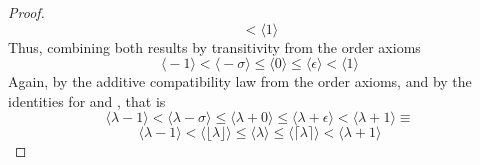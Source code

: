 \documentclass[preview]{standalone}
\begin{document}
\begin{proof}
\begin{equation*}
            <
        \Big \langle 1 \Big \rangle
    \end{equation*}
    Thus, combining both results by transitivity from the order axioms
    \begin{equation*}
        \Big \langle -1 \Big \rangle
            <
        \Big \langle - \sigma \Big \rangle
            \leq
        \Big \langle 0 \Big \rangle
            \leq
        \Big \langle \epsilon \Big \rangle
            <
        \Big \langle 1 \Big \rangle
    \end{equation*}
    Again, by the additive compatibility law from the order axioms, 
    and by the identities for 
    \bm{$\lfloor \lambda \rfloor$} and \bm{$\lceil \lambda \rceil$},
    that is
    \begin{equation*}
        \Big \langle \lambda - 1 \Big \rangle
            <
        \Big \langle \lambda - \sigma \Big \rangle
            \leq
        \Big \langle \lambda + 0 \Big \rangle
            \leq
        \Big \langle \lambda + \epsilon \Big \rangle
            <
        \Big \langle \lambda + 1 \Big \rangle
            \equiv
    \end{equation*}
    \begin{equation*}
        \Big \langle \lambda - 1 \Big \rangle
            <
        \Big \langle \lfloor \lambda \rfloor \Big \rangle
            \leq
        \Big \langle \lambda \Big \rangle
            \leq
        \Big \langle \lceil \lambda \rceil \Big \rangle
            <
        \Big \langle \lambda + 1 \Big \rangle
    \end{equation*}
\end{proof}
\end{document}
